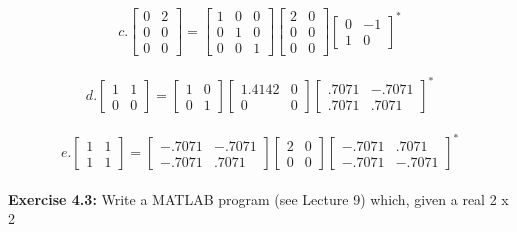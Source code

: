\documentclass[12pt]{article}
\begin{document}
$$
	c. \begin{bmatrix}
			0 & 2 \\
			0 & 0 \\
			0 & 0
		\end{bmatrix} =
		\begin{bmatrix}
			1 & 0 & 0 \\
			0 & 1 & 0 \\
			0 & 0 & 1
		\end{bmatrix}
		\begin{bmatrix}
			2 & 0 \\
			0 & 0 \\
			0 & 0
		\end{bmatrix}
		\begin{bmatrix}
			0 & -1 \\
			1 & 0 
		\end{bmatrix}^*			
$$ \\
$$
	d. \begin{bmatrix}
			1 & 1 \\
			0 & 0
		\end{bmatrix} =
		\begin{bmatrix}
			1 & 0 \\
			0 & 1 
		\end{bmatrix}
		\begin{bmatrix}
			1.4142 & 0 \\
			0 & 0 
		\end{bmatrix}
		\begin{bmatrix}
			.7071 & -.7071 \\
			.7071 & .7071 
		\end{bmatrix}^*		
$$ \\
$$
	e. \begin{bmatrix}
			1 & 1 \\
			1 & 1
		\end{bmatrix} =
		\begin{bmatrix}
			-.7071 & -.7071 \\
			-.7071 & .7071 
		\end{bmatrix}
		\begin{bmatrix}
			2 & 0 \\
			0 & 0 
		\end{bmatrix}
		\begin{bmatrix}
			-.7071 & .7071 \\
			-.7071 & -.7071 
		\end{bmatrix}^*			
$$ \\
\newpage
\noindent \textbf{Exercise 4.3: } Write a MATLAB program (see Lecture 9) which, given a real 2 x 2
\end{document}
